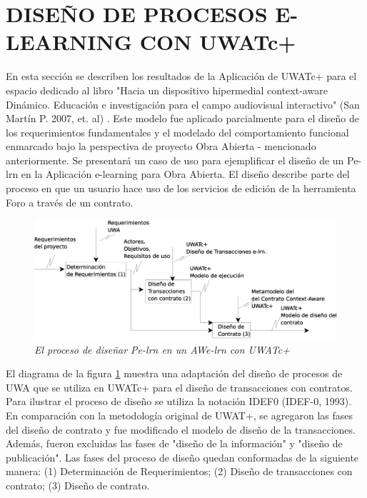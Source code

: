 \section {DISEÑO DE PROCESOS E-LEARNING CON UWATc+} \label{diseno}

En esta sección se describen los resultados de la Aplicación de UWATc+ para el
espacio dedicado al libro "Hacia un dispositivo hipermedial context-aware
Dinámico. Educación e investigación para el campo audiovisual interactivo" (San
Martín P. 2007, et. al) \cite{libro}.  Este  modelo fue aplicado parcialmente
para el diseño de los requerimientos fundamentales y el modelado del
comportamiento funcional enmarcado bajo la perspectiva de proyecto Obra Abierta
- mencionado anteriormente. Se presentará un caso de uso para ejemplificar el
diseño de un Pe-lrn en la Aplicación e-learning para Obra Abierta. El diseño
describe parte del proceso en que un usuario hace uso de los servicios de
edición de la herramienta Foro a través de un contrato. 

	\begin{figure}[!h]
        \begin{center}
	\includegraphics[width=6 in,totalheight=2 in]{procesodisenoNuevo.eps}
	\caption{\small \sl El proceso de diseñar Pe-lrn en un AWe-lrn con
UWATc+} \label{procesodediseno}
         \end{center}
         \end{figure}



El diagrama de la figura \ref{procesodediseno} muestra una adaptación del diseño
de procesos de UWA \cite{UWA} que se utiliza en UWATc+ para el diseño de
transacciones con contratos. Para ilustrar el proceso de diseño se utiliza la
notación IDEF0 (IDEF-0, 1993). En comparación con la metodología original de
UWAT+, se agregaron las fases del diseño de contrato y fue modificado el modelo
de diseño de la transacciones. Además, fueron excluidas las fases de "diseño de
la información" y "diseño de publicación". Las fases del proceso de diseño
quedan conformadas de la siguiente manera: (1) Determinación de Requerimientos;
(2) Diseño de transacciones con contrato; (3) Diseño de contrato.

